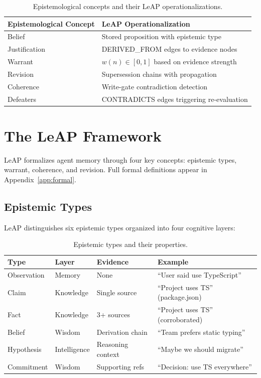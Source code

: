 \documentclass[11pt,letterpaper]{article}
\begin{document}
\begin{table}[H]
\centering
\caption{Epistemological concepts and their LeAP operationalizations.}
\label{tab:concepts}
\begin{tabular}{@{}ll@{}}
\toprule
\textbf{Epistemological Concept} & \textbf{LeAP Operationalization} \\
\midrule
Belief & Stored proposition with epistemic type \\
Justification & DERIVED\_FROM edges to evidence nodes \\
Warrant & $w(n) \in [0,1]$ based on evidence strength \\
Revision & Supersession chains with propagation \\
Coherence & Write-gate contradiction detection \\
Defeaters & CONTRADICTS edges triggering re-evaluation \\
\bottomrule
\end{tabular}
\end{table}

\section{The LeAP Framework}
\label{sec:leap}

LeAP formalizes agent memory through four key concepts: epistemic types, warrant, coherence, and revision. Full formal definitions appear in Appendix~\ref{app:formal}.

\subsection{Epistemic Types}

LeAP distinguishes six epistemic types organized into four cognitive layers:

\begin{table}[H]
\centering
\caption{Epistemic types and their properties.}
\label{tab:types}
\begin{tabular}{@{}lllp{4cm}@{}}
\toprule
\textbf{Type} & \textbf{Layer} & \textbf{Evidence} & \textbf{Example} \\
\midrule
Observation & Memory & None & ``User said use TypeScript'' \\
Claim & Knowledge & Single source & ``Project uses TS'' (package.json) \\
Fact & Knowledge & 3+ sources & ``Project uses TS'' (corroborated) \\
Belief & Wisdom & Derivation chain & ``Team prefers static typing'' \\
Hypothesis & Intelligence & Reasoning context & ``Maybe we should migrate'' \\
Commitment & Wisdom & Supporting refs & ``Decision: use TS everywhere'' \\
\bottomrule
\end{tabular}
\end{table}
\end{document}
